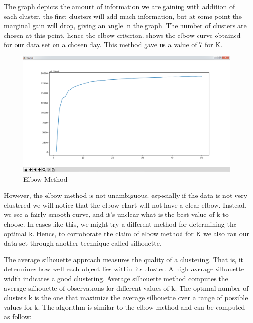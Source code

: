  	The graph depicts the amount of information we are gaining with addition of each cluster. the first clusters will add much information, but at some point the marginal gain will drop, giving an angle in the graph. The number of clusters are chosen at this point, hence the elbow criterion.  shows the elbow curve obtained for our data set on a chosen day. This method gave us a value of 7 for K.
 	

\begin{figure}[t]
	\centerline{\includegraphics[scale = 0.4]{elbow.png}}
	\caption{Elbow Method}%
\end{figure}

 However, the elbow method is not unambiguous. especially if the data is not very clustered we will notice that the elbow chart will not have a clear elbow. Instead, we see a fairly smooth curve, and it's unclear what is the best value of k to choose. In cases like this, we might try a different method for determining the optimal k. Hence, to corroborate the claim of elbow method for K we also ran our data set through another technique called silhouette.

	The average silhouette approach measures the quality of a clustering. That is, it determines how well each object lies within its cluster. A high average silhouette width indicates a good clustering.	Average silhouette method computes the average silhouette of observations for different values of k. The optimal number of clusters k is the one that maximize the average silhouette over a range of possible values for k.	The algorithm is similar to the elbow method and can be computed as follow: 
	
